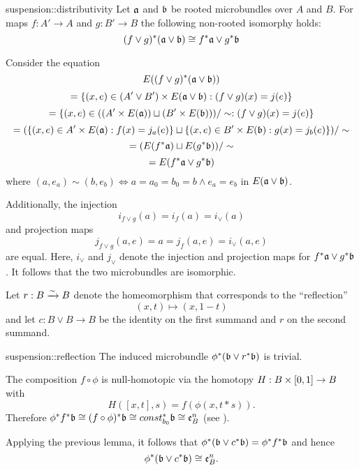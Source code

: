 \begin{mylemma}{suspension::distributivity}
    Let $\mathfrak{a}$ and $\mathfrak{b}$ be rooted microbundles over $A$ and $B$.
    For maps $f: A' \to A$ and $g: B' \to B$ the following non-rooted isomorphy holds:
    \[ (f \vee g)^*(\mathfrak{a} \vee \mathfrak{b}) \cong f^*\mathfrak{a} \vee g^*\mathfrak{b} \]
\end{mylemma}

\begin{myproof}
    Consider the equation
    \[ E((f \vee g)^*(\mathfrak{a} \vee \mathfrak{b})) \]
    \[ = \{(x, e) \in (A' \vee B') \times E(\mathfrak{a} \vee \mathfrak{b}):(f \vee g)(x) = j(e)\} \]
    \[ = \{(x, e) \in ((A' \times E(\mathfrak{a})) \sqcup (B' \times E(\mathfrak{b}))) / \sim:(f \vee g)(x) = j(e)\} \]
    \[ = (\{(x, e) \in A' \times E(\mathfrak{a}):f(x) = j_a(e)\} \sqcup \{(x, e) \in B' \times E(\mathfrak{b}):g(x) = j_b(e)\}) / \sim \]
    \[ = (E(f^*\mathfrak{a}) \sqcup E(g^*\mathfrak{b})) / \sim \]
    \[ = E(f^*\mathfrak{a} \vee g^*\mathfrak{b}) \]
    where $(a, e_a) \sim (b, e_b) \iff a = a_0 = b_0 = b \land e_a = e_b$ in $E(\mathfrak{a} \vee \mathfrak{b})$.

    Additionally, the injection
    \[ i_{f \vee g}(a) = i_f(a) = i_{\vee}(a) \]
    and projection maps
    \[ j_{f \vee g}(a, e) = a = j_f(a, e) = i_{\vee}(a, e) \]
    are equal.
    Here, $i_\vee$ and $j_\vee$ denote the
    injection and projection maps for $f^*\mathfrak{a} \vee g^*\mathfrak{b}$.
    It follows that the two microbundles are isomorphic.
\end{myproof}

\begin{myparagraph}
    Let $r: B \xrightarrow{\sim} B$ denote the homeomorphism that corresponds to the ``reflection''
    \[ (x, t) \mapsto (x, 1 - t)\]
    and let $c: B \vee B \to B$ be the identity on the first summand and $r$ on the second summand.
\end{myparagraph}

\begin{mylemma}{suspension::reflection}
    The induced microbundle $\phi^*(\mathfrak{b} \vee r^*\mathfrak{b})$ is trivial.
\end{mylemma}
\begin{myproof}
    The composition $f \circ \phi$ is null-homotopic via the homotopy $H: B \times [0, 1] \to B$ with
    \[ H([x, t], s) = f(\phi(x, t * s)). \]
    Therefore $\phi^*f^*\mathfrak{b} \cong (f \circ \phi)^*\mathfrak{b}\cong const_{b_0}^*\mathfrak{b} \cong \mathfrak{e}^{n}_{B}$ (see ).
    
    Applying the previous lemma, it follows that $\phi^*(\mathfrak{b} \vee c^*\mathfrak{b}) = \phi^*f^*\mathfrak{b}$ and hence
    \[ \phi^*(\mathfrak{b} \vee c^*\mathfrak{b}) \cong \mathfrak{e}^{n}_{B}. \]
\end{myproof}